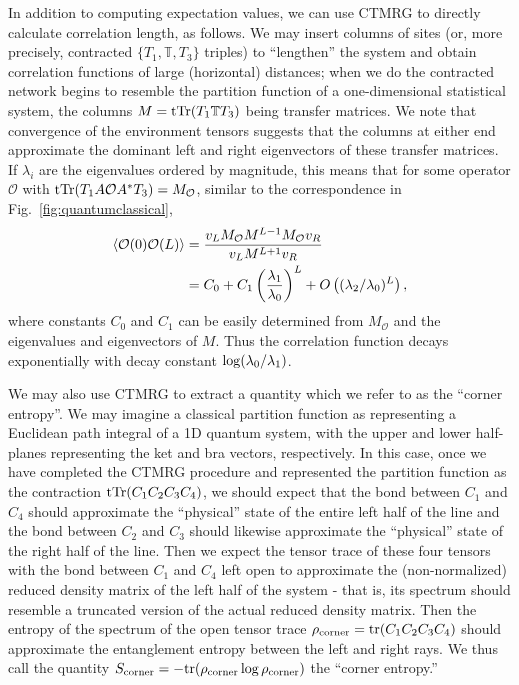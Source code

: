 \documentclass[aps,prb,letterpaper,superscriptaddress,twocolumn,showpacs,floatfix,10pt]{revtex4-1}
\begin{document}
In addition to computing expectation values, we can use CTMRG to
directly calculate correlation length, as follows. We may insert columns of
sites (or, more precisely, contracted $\{T_1,\mathbb{T},T_3\}$ triples) to
``lengthen'' the system and obtain correlation functions of large (horizontal)
distances; when we do the contracted network begins to resemble the partition
function of a one-dimensional statistical system, the columns 
$M = \operatorname{tTr}(T_1\mathbb{T}T_3)$ being transfer matrices.  We note that
convergence of the environment tensors suggests that the columns at either end
approximate the dominant left and right eigenvectors of these transfer matrices.
If $\lambda_i$ are the eigenvalues ordered by magnitude, this means that
for some operator $\mathcal{O}$ with
$\operatorname{tTr}(T_1A\mathcal{O}A^* T_3)=M_\mathcal{O}$, similar to the correspondence
in Fig.~\ref{fig:quantumclassical},
\begin{align}
\langle \mathcal{O}(0)\mathcal{O}(L)\rangle
&= \frac{v_LM_\mathcal{O}M^{L-1}M_\mathcal{O}v_R}{v_LM^{L+1}v_R} \notag\\
&= C_0 + C_1\left(\frac{\lambda_1}{\lambda_0}\right)^L + O\left((\lambda_2/\lambda_0)^L\right),
\end{align}
where constants $C_0$ and $C_1$ can be easily determined from $M_\mathcal{O}$
and the eigenvalues and eigenvectors of $M$. Thus the correlation function
decays exponentially with decay constant $\operatorname{log}(\lambda_0/\lambda_1)$.

We may also use CTMRG to extract a quantity which we refer to as the ``corner
entropy''. We may imagine a classical partition function as representing a
Euclidean path integral of a 1D quantum system\cite{TNRMERA}, with the upper and
lower half-planes representing the ket and bra vectors, respectively. In this
case, once we have completed the CTMRG procedure and represented the partition
function as the contraction $\operatorname{tTr}(C_1C_2C_3C_4)$, we should expect that
the bond between $C_1$ and $C_4$ should approximate the ``physical'' state
of the entire left half of the line
and the bond between $C_2$ and $C_3$ should likewise approximate the
``physical'' state of the right half of the line. Then we expect
the tensor trace of these four tensors with the bond between $C_1$ and $C_4$
left open to approximate the (non-normalized) reduced density matrix of the
left half of the system - that is, its spectrum should resemble a truncated
version of the actual reduced density matrix.
Then the entropy of the spectrum of the open
tensor trace $\rho_\text{corner} = \operatorname{tr}(C_1C_2C_3C_4)$
should approximate the entanglement entropy between the left and
right rays. We thus call the quantity
$S_\text{corner}=-\!\operatorname{tr}(\rho_\text{corner}\log \rho_\text{corner})$
the ``corner entropy.''
\end{document}

